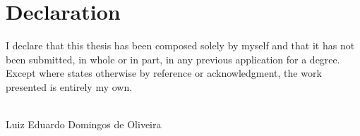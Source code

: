 \chapter*{Declaration}
I declare that this thesis has been composed solely by myself and that it has not been submitted, in whole or in part, in any previous application for a degree. Except where states otherwise by reference or acknowledgment, the work presented is entirely my own.
\\[3\baselineskip]
  
\hspace{7.5cm}
\begin{minipage}{0.5\textwidth}
    \begin{center}
    \begin{minipage}{8cm}
        \hrulefill
    \end{minipage}\\
    Luiz Eduardo Domingos de Oliveira
    \end{center}
\end{minipage}